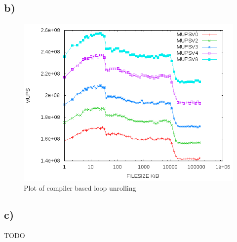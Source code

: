 \documentclass{article}
\begin{document}
\subsection*{b)}

\begin{center}
	\begin{figure}[h]
	\includegraphics[scale=0.6]{pics/a4b.png}
	\caption{Plot of compiler based loop unrolling}
	\end{figure}
\end{center}

\subsection*{c)}
TODO
\end{document}
